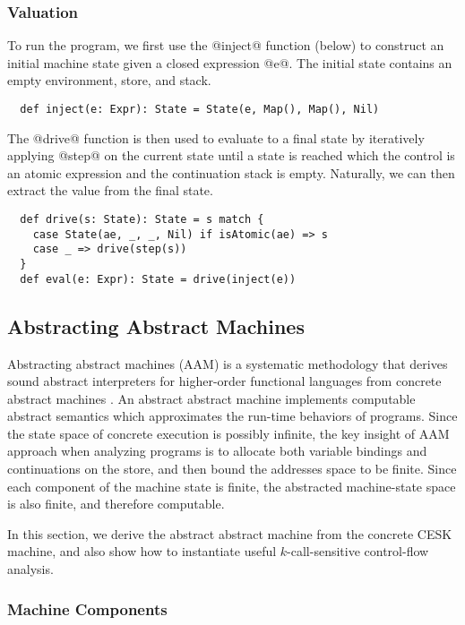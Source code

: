 \documentclass[acmsmall, review]{acmart}\settopmatter{}
\begin{document}
\subsubsection{Valuation}\label{sec:drive}

To run the program, we first use the @inject@ function (below) to construct an initial 
machine state given a closed expression @e@. The initial state contains an empty environment,
store, and stack.
\begin{lstlisting}
  def inject(e: Expr): State = State(e, Map(), Map(), Nil)
\end{lstlisting}

The @drive@ function is then used to evaluate to a final state by iteratively applying 
@step@ on the current state until a state is reached which the control is an atomic 
expression and the continuation stack is empty. Naturally, we can then extract the value
from the final state.

\begin{lstlisting}
  def drive(s: State): State = s match {
    case State(ae, _, _, Nil) if isAtomic(ae) => s
    case _ => drive(step(s))
  }
  def eval(e: Expr): State = drive(inject(e))
\end{lstlisting}

\subsection{Abstracting Abstract Machines} \label{aam}
Abstracting abstract machines (AAM) is a systematic methodology that derives sound
abstract interpreters for higher-order functional languages from concrete abstract 
machines \cite{van2012systematic, van2010abstracting}. An abstract abstract machine
implements computable abstract semantics which approximates the run-time behaviors of 
programs.
Since the state space of concrete execution is possibly infinite, the key insight of 
AAM approach when analyzing programs is to allocate both variable bindings and continuations 
on the store, and then bound the addresses space to be finite. Since each component
of the machine state is finite, the abstracted machine-state space is also finite, 
and therefore computable.

In this section, we derive the abstract abstract machine from the concrete
CESK machine, and also show how to instantiate useful $k$-call-sensitive 
control-flow analysis.

\subsubsection{Machine Components}
\end{document}

